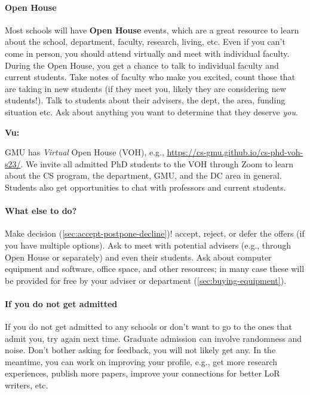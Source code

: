 \documentclass[oneside,11pt]{memoir}
\newenvironment{commentbox}[1][]{
  \small
  \begin{mybox}
    {\small \textbf{#1}}
  }{
  \end{mybox}
}
\begin{document}
\paragraph{Open House} Most schools will have \textbf{Open House} events, which are a great resource to learn about the school, department, faculty, research, living, etc. Even if you can't come in person, you should attend virtually and meet with individual faculty.
During the Open House, you get a chance to talk to individual faculty and current students.  Take notes of faculty who make you excited, count those that are taking in new students (if they meet you, likely they are considering new students!).  Talk to students about their advisers, the dept, the area, funding situation etc.  Ask about anything you want to determine that they deserve \emph{you}.

\begin{commentbox}[Vu:]
  GMU has \emph{Virtual} Open House (VOH), e.g., \url{https://cs-gmu.github.io/cs-phd-voh-s23/}. We invite all admitted PhD students to the VOH through Zoom to learn about the CS program, the department, GMU, and the DC area in general. Students also get opportunities to chat with professors and current students.
\end{commentbox}

\paragraph{What else to do?} Make decision (\autoref{sec:accept-postpone-decline})! accept, reject, or defer the offers (if you have multiple options). Ask to meet with potential advisers (e.g., through Open House or separately) and even their students. Ask about computer equipment and software, office space, and other resources; in many case these will be provided for free by your adviser or department (\autoref{sec:buying-equipment}). 

\paragraph{If you do not get admitted} If you do not get admitted to any schools or don't want to go to the ones that admit you, try again next time.  Graduate admission can involve randomness and noise.  Don't bother asking for feedback, you will not likely get any.  In the meantime, you can work on improving your profile, e.g., get more research experiences, publish more papers, improve your connections for better LoR writers, etc.
\end{document}
